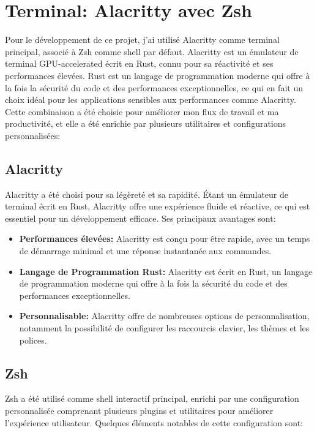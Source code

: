 \section{Terminal: Alacritty avec Zsh}

\hspace{16pt}Pour le développement de ce projet, j'ai utilisé Alacritty comme terminal principal, associé à Zsh comme shell par défaut. Alacritty est un émulateur de terminal GPU-accelerated écrit en Rust, connu pour sa réactivité et ses performances élevées. Rust est un langage de programmation moderne qui offre à la fois la sécurité du code et des performances exceptionnelles, ce qui en fait un choix idéal pour les applications sensibles aux performances comme Alacritty. Cette combinaison a été choisie pour améliorer mon flux de travail et ma productivité, et elle a été enrichie par plusieurs utilitaires et configurations personnalisées:

\subsection{Alacritty}

\hspace{16pt}Alacritty a été choisi pour sa légèreté et sa rapidité. Étant un émulateur de terminal écrit en Rust, Alacritty offre une expérience fluide et réactive, ce qui est essentiel pour un développement efficace. Ses principaux avantages sont:

\begin{itemize}
  \item \textbf{Performances élevées: }Alacritty est conçu pour être rapide, avec un temps de démarrage minimal et une réponse instantanée aux commandes.
  \item \textbf{Langage de Programmation Rust: }Alacritty est écrit en Rust, un langage de programmation moderne qui offre à la fois la sécurité du code et des performances exceptionnelles.
  \item \textbf{Personnalisable: }Alacritty offre de nombreuses options de personnalisation, notamment la possibilité de configurer les raccourcis clavier, les thèmes et les polices.
\end{itemize}

\subsection{Zsh}

\hspace{16pt}Zsh a été utilisé comme shell interactif principal, enrichi par une configuration personnalisée comprenant plusieurs plugins et utilitaires pour améliorer l'expérience utilisateur. Quelques éléments notables de cette configuration sont:


